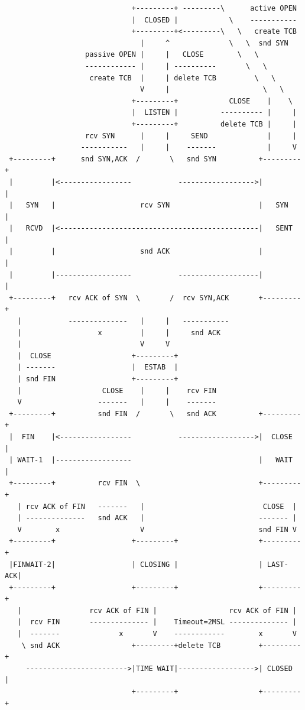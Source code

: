 \begin{frame}[fragile]
\begin{columns}[T]
\begin{Tiny}
\begin{verbatim}
                              +---------+ ---------\      active OPEN  
                              |  CLOSED |            \    -----------  
                              +---------+<---------\   \   create TCB  
                                |     ^              \   \  snd SYN    
                   passive OPEN |     |   CLOSE        \   \           
                   ------------ |     | ----------       \   \         
                    create TCB  |     | delete TCB         \   \       
                                V     |                      \   \     
                              +---------+            CLOSE    |    \   
                              |  LISTEN |          ---------- |     |  
                              +---------+          delete TCB |     |  
                   rcv SYN      |     |     SEND              |     |  
                  -----------   |     |    -------            |     V  
 +---------+      snd SYN,ACK  /       \   snd SYN          +---------+
 |         |<-----------------           ------------------>|         |
 |   SYN   |                    rcv SYN                     |   SYN   |
 |   RCVD  |<-----------------------------------------------|   SENT  |
 |         |                    snd ACK                     |         |
 |         |------------------           -------------------|         |
 +---------+   rcv ACK of SYN  \       /  rcv SYN,ACK       +---------+
   |           --------------   |     |   -----------                  
   |                  x         |     |     snd ACK                    
   |                            V     V                                
   |  CLOSE                   +---------+                              
   | -------                  |  ESTAB  |                              
   | snd FIN                  +---------+                              
   |                   CLOSE    |     |    rcv FIN                     
   V                  -------   |     |    -------                     
 +---------+          snd FIN  /       \   snd ACK          +---------+
 |  FIN    |<-----------------           ------------------>|  CLOSE  |
 | WAIT-1  |------------------                              |   WAIT  |
 +---------+          rcv FIN  \                            +---------+
   | rcv ACK of FIN   -------   |                            CLOSE  |  
   | --------------   snd ACK   |                           ------- |  
   V        x                   V                           snd FIN V  
 +---------+                  +---------+                   +---------+
 |FINWAIT-2|                  | CLOSING |                   | LAST-ACK|
 +---------+                  +---------+                   +---------+
   |                rcv ACK of FIN |                 rcv ACK of FIN |  
   |  rcv FIN       -------------- |    Timeout=2MSL -------------- |  
   |  -------              x       V    ------------        x       V  
    \ snd ACK                 +---------+delete TCB         +---------+
     ------------------------>|TIME WAIT|------------------>| CLOSED  |
                              +---------+                   +---------+


\end{verbatim}
\end{Tiny}
\end{columns}
\end{frame}
